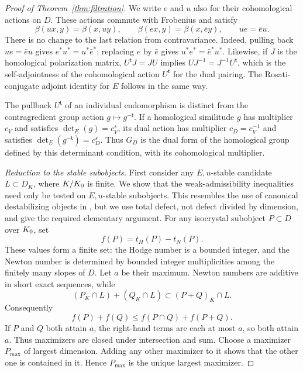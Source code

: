 \begin{proof}[Proof of Theorem~\ref{thm:filtration}]
We write $e$ and $u$ also for their cohomological actions on $D$.
These actions commute with Frobenius and satisfy
\begin{equation}
\label{eq:filtration-adjoints}
 \beta(ux,y)=\beta(x,uy),\qquad
 \beta(ex,y)=\beta(x,\bar e y),\qquad ue=\bar e u.
\end{equation}
There is no change to the last relation from contravariance.  Indeed,
pulling back $ue=\bar e u$ gives $e^*u^*=u^*\bar e^*$; replacing $e$
by $\bar e$ gives $u^*e^*=\bar e^*u^*$.  Likewise, if $J$ is the
homological polarization matrix, $U^{\mathsf t}J=JU$ implies
$UJ^{-1}=J^{-1}U^{\mathsf t}$, which is the self-adjointness of the
cohomological action $U^{\mathsf t}$ for the dual pairing.  The
Rosati-conjugate adjoint identity for $E$ follows in the same way.

The pullback $U^{\mathsf t}$ of an individual endomorphism is
distinct from the contragredient group action $g\mapsto g^{-\mathsf t}$.
If a homological similitude $g$ has multiplier $c_V$ and satisfies
$\det_E(g)=c_V^s$, its dual action has multiplier $c_D=c_V^{-1}$
and satisfies $\det_E(g^{-\mathsf t})=c_D^s$.
Thus $G_D$ is the dual form of the homological group defined by this
determinant condition, with its cohomological multiplier.

\medskip\noindent
\emph{Reduction to the stable subobjects.}
First consider any $E,u$-stable candidate $L\subset D_K$, where
$K/K_0$ is finite. We show that the weak-admissibility inequalities
need only be tested on $E,u$-stable subobjects. This resembles the use of canonical
destabilizing objects in \cite[Section~2]{FontaineRapoport2005},
but we use total defect, not defect divided by dimension, and give
the required elementary argument.
For any isocrystal subobject $P\subset D$ over $K_0$, set
\[
 f(P)=t_H(P)-t_N(P).
\]
These values form a finite set: the Hodge number is a bounded integer,
and the Newton number is determined by bounded integer multiplicities
among the finitely many slopes of $D$.  Let $a$ be their maximum.
Newton numbers are additive in short exact sequences, while
\[
 (P_K\cap L)+(Q_K\cap L)\subset (P+Q)_K\cap L.
\]
Consequently
\begin{equation}
\label{eq:filtration-supermodularity}
 f(P)+f(Q)\leq f(P\cap Q)+f(P+Q).
\end{equation}
If $P$ and $Q$ both attain $a$, the right-hand terms are each at
most $a$, so both attain $a$.  Thus maximizers are closed under
intersection and sum.  Choose a maximizer $P_{\max}$ of largest
dimension.  Adding any other maximizer to it shows that the other
one is contained in it.  Hence $P_{\max}$ is the unique largest
maximizer.


\end{proof}
